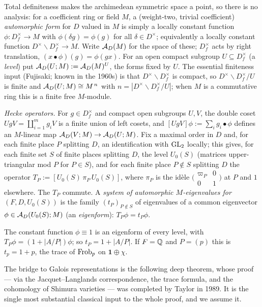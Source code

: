\documentclass[11pt]{article}
\begin{document}
Total definiteness makes the archimedean symmetric space a point, so there is
no analysis: for a coefficient ring or field $M$, a (weight-two, trivial
coefficient) \emph{automorphic form} for $D$ valued in $M$ is simply a locally
constant function $\phi\colon D_f^\times\to M$ with $\phi(\delta g)=\phi(g)$ for
all $\delta\in D^\times$; equivalently a locally constant function
$D^\times\backslash D_f^\times\to M$. Write $\mathcal{A}_D(M)$ for the space of these;
$D_f^\times$ acts by right translation, $(x\bullet\phi)(g)=\phi(gx)$. For an
open compact subgroup $U\subseteq D_f^\times$ (a \emph{level}) put
$\mathcal{A}_D(U;M):=\mathcal{A}_D(M)^U$, the forms fixed by $U$. The essential finiteness
input (Fujisaki; known in the 1960s) is that $D^\times\backslash D_f^\times$ is
compact, so $D^\times\backslash D_f^\times/U$ is finite and
$\mathcal{A}_D(U;M)\cong M^{\,n}$ with $n=|D^\times\backslash D_f^\times/U|$; when $M$
is a commutative ring this is a finite free $M$-module.

\emph{Hecke operators.} For $g\in D_f^\times$ and compact open subgroups $U,V$,
the double coset $UgV=\coprod_{i=1}^{m} g_iV$ is a finite union of left cosets,
and $[UgV]\phi:=\sum_i g_i\bullet\phi$ defines an $M$-linear map
$\mathcal{A}_D(V;M)\to\mathcal{A}_D(U;M)$. Fix a maximal order in $D$ and, for each finite
place $P$ splitting $D$, an identification with $\operatorname{GL}_2$ locally; this gives, for
each finite set $S$ of finite places splitting $D$, the level
$U_0(S)$ (matrices upper-triangular mod $P$ for $P\in S$), and for each finite
place $P\notin S$ splitting $D$ the operator
$T_P:=[U_0(S)\,\pi_P\,U_0(S)]$, where $\pi_P$ is the id\`ele
$\bigl(\begin{smallmatrix}\varpi_P&0\\0&1\end{smallmatrix}\bigr)$ at $P$ and $1$
elsewhere. The $T_P$ commute. A \emph{system of automorphic $M$-eigenvalues for
$(F,D,U_0(S))$} is the family $(t_P)_{P\notin S}$ of eigenvalues of a common
eigenvector $\phi\in\mathcal{A}_D(U_0(S);M)$ (an \emph{eigenform}): $T_P\phi=t_P\phi$.

\begin{example}
The constant function $\phi\equiv1$ is an eigenform of every level, with
$T_P\phi=(1+|A/P|)\phi$; so $t_P=1+|A/P|$. If $F=\mathbb{Q}$ and $P=(p)$ this is
$t_p=1+p$, the trace of $\operatorname{Frob}_p$ on $\mathbf1\oplus\chi$.
\end{example}

The bridge to Galois representations is the following deep theorem, whose proof
--- via the Jacquet--Langlands correspondence, the trace formula, and the
cohomology of Shimura varieties --- was completed by Taylor in 1989. It is the
single most substantial classical input to the whole proof, and we assume it.
\end{document}
